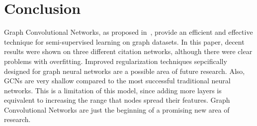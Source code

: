 \section{Conclusion}

Graph Convolutional Networks, as proposed in~\cite{Kipf2016}, provide an efficient and effective technique for semi-supervised learning on graph datasets. In this paper, decent results were shown on three different citation networks, although there were clear problems with overfitting. Improved regularization techniques sepcifically designed for graph neural networks are a possible area of future research. Also, GCNs are very shallow compared to the most successful traditional neural networks. This is a limitation of this model, since adding more layers is equivalent to increasing the range that nodes spread their features. Graph Convolutional Networks are just the beginning of a promising new area of research. 
